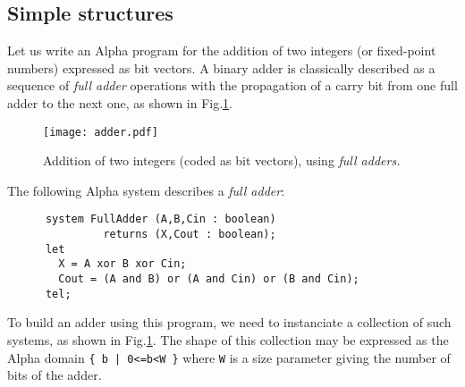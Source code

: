 \documentclass[12pt]{article}
\newcommand{\Alpha}{{\sc Alpha}}
\newcommand{\alfa}{\Alpha}
\begin{document}
\subsection{Simple structures} 
Let us write an {\alfa} program for the addition of two integers
(or fixed-point numbers) expressed as bit vectors.  A binary
adder is classically described as a sequence of \emph{full adder}
operations with the propagation of a carry bit from one full adder to
the next one, as shown in Fig.\ref{adder}.

\begin{figure}[!ht]
  \centerline{
    \texttt{[image: adder.pdf]}
  }
\caption{Addition of two integers (coded as bit vectors), using \emph{full adders.}\label{adder}}
\end{figure}

The following \alfa{} system describes a \emph{full adder}:
\begin{verbatim}
      system FullAdder (A,B,Cin : boolean) 
               returns (X,Cout : boolean);
      let
        X = A xor B xor Cin;
        Cout = (A and B) or (A and Cin) or (B and Cin);
      tel;
\end{verbatim}

To build an adder using this program, we need to 
instanciate a collection of such systems,
as shown in Fig.\ref{adder}. The shape of this collection may
be expressed as the {\alfa} domain \texttt{\{~b~|~0<=b<W~\}} where
\texttt{W} is a size parameter giving the number of bits of the
adder.
\end{document}
